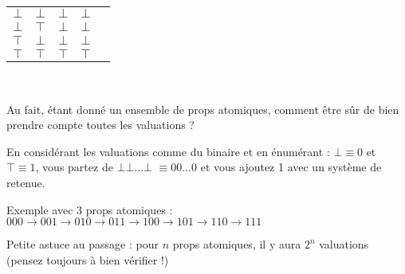 \begin{frame}
{\begin{tabular}{c|c||c|c|c}
$\bot$ & $\bot$ & $\bot$ & $\bot$ &  \\
$\bot$ & $\top$ & $\bot$ & $\bot$ &  \\
$\top$ & $\bot$ & $\bot$ & $\bot$ &  \\
$\top$ & $\top$ & $\top$ & $\top$ & \\
\end{tabular}}
\pause

\textcolor{white}{saut de ligne discret}\newline
{}

\end{frame}


\begin{frame}

Au fait, étant donné un ensemble de props atomiques, comment être sûr de bien prendre compte toutes les valuations ?\pause\newline

En considérant les valuations comme du binaire et en énumérant : $\bot \equiv 0$ et $\top \equiv 1$, vous partez de $\bot\bot\dots\bot$ $\equiv 00\dots0$ et vous ajoutez 1 avec un système de retenue.\pause\newline

Exemple avec 3 props atomiques : $000 \rightarrow 001 \rightarrow 010 \rightarrow 011 \rightarrow 100 \rightarrow 101 \rightarrow 110 \rightarrow 111$\pause\newline

Petite astuce au passage : pour $n$ props atomiques, il y aura $2^n$ valuations (pensez toujours à bien vérifier !)

\end{frame}



